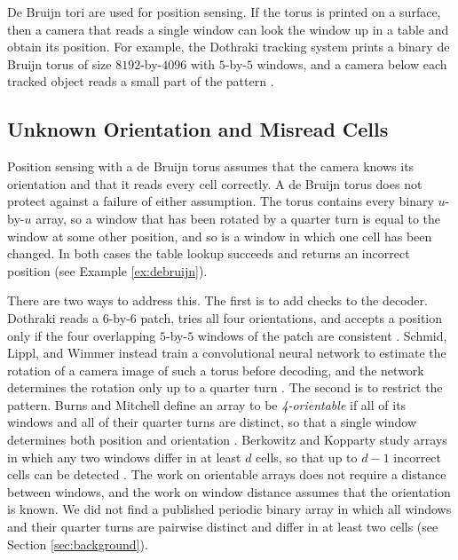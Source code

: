 \documentclass{lipics-v2021}
\begin{document}
De Bruijn tori are used for position sensing.
If the torus is printed on a surface, then a camera that reads a single window can look the window up in a table and obtain its position.
For example, the Dothraki tracking system prints a binary de Bruijn torus of size $8192$-by-$4096$ with $5$-by-$5$ windows, and a camera below each tracked object reads a small part of the pattern \cite{schusselbauer2021dothraki}.

\subsection{Unknown Orientation and Misread Cells}
\label{sec:intro_problems}

Position sensing with a de Bruijn torus assumes that the camera knows its orientation and that it reads every cell correctly.
A de Bruijn torus does not protect against a failure of either assumption.
The torus contains every binary $u$-by-$u$ array, so a window that has been rotated by a quarter turn is equal to the window at some other position, and so is a window in which one cell has been changed.
In both cases the table lookup succeeds and returns an incorrect position (see Example \ref{ex:debruijn}).

There are two ways to address this.
The first is to add checks to the decoder.
Dothraki reads a $6$-by-$6$ patch, tries all four orientations, and accepts a position only if the four overlapping $5$-by-$5$ windows of the patch are consistent \cite{schusselbauer2021dothraki}.
Schmid, Lippl, and Wimmer instead train a convolutional neural network to estimate the rotation of a camera image of such a torus before decoding, and the network determines the rotation only up to a quarter turn \cite{schmid2022determining}.
The second is to restrict the pattern.
Burns and Mitchell define an array to be \emph{4-orientable} if all of its windows and all of their quarter turns are distinct, so that a single window determines both position and orientation \cite{burns1993coding}.
Berkowitz and Kopparty study arrays in which any two windows differ in at least $d$ cells, so that up to $d-1$ incorrect cells can be detected \cite{berkowitz2016robust}.
The work on orientable arrays does not require a distance between windows, and the work on window distance assumes that the orientation is known.
We did not find a published periodic binary array in which all windows and their quarter turns are pairwise distinct and differ in at least two cells (see Section \ref{sec:background}).
\end{document}
